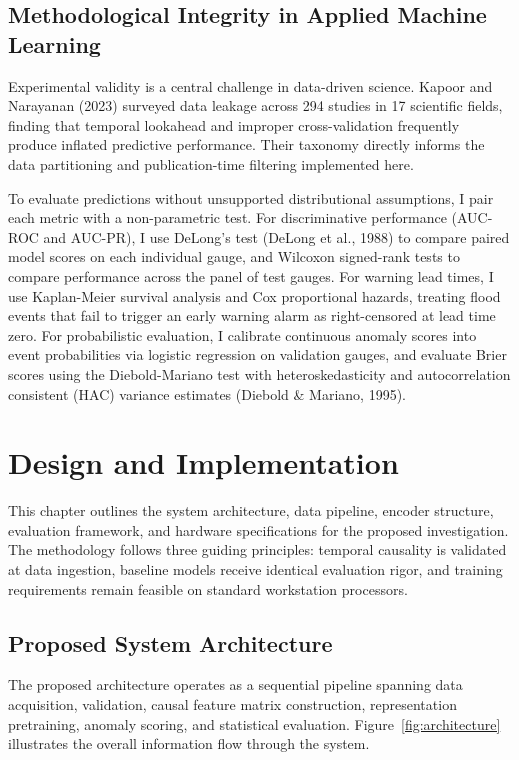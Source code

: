 \documentclass[12pt]{report}
\begin{document}
\section{Methodological Integrity in Applied Machine Learning}

Experimental validity is a central challenge in data-driven science. Kapoor and Narayanan (2023) surveyed data leakage across 294 studies in 17 scientific fields, finding that temporal lookahead and improper cross-validation frequently produce inflated predictive performance. Their taxonomy directly informs the data partitioning and publication-time filtering implemented here.

To evaluate predictions without unsupported distributional assumptions, I pair each metric with a non-parametric test. For discriminative performance (AUC-ROC and AUC-PR), I use DeLong's test (DeLong et al., 1988) to compare paired model scores on each individual gauge, and Wilcoxon signed-rank tests to compare performance across the panel of test gauges. For warning lead times, I use Kaplan-Meier survival analysis and Cox proportional hazards, treating flood events that fail to trigger an early warning alarm as right-censored at lead time zero. For probabilistic evaluation, I calibrate continuous anomaly scores into event probabilities via logistic regression on validation gauges, and evaluate Brier scores using the Diebold-Mariano test with heteroskedasticity and autocorrelation consistent (HAC) variance estimates (Diebold \& Mariano, 1995).


\chapter{Design and Implementation}

This chapter outlines the system architecture, data pipeline, encoder structure, evaluation framework, and hardware specifications for the proposed investigation. The methodology follows three guiding principles: temporal causality is validated at data ingestion, baseline models receive identical evaluation rigor, and training requirements remain feasible on standard workstation processors.

\section{Proposed System Architecture}

The proposed architecture operates as a sequential pipeline spanning data acquisition, validation, causal feature matrix construction, representation pretraining, anomaly scoring, and statistical evaluation. Figure~\ref{fig:architecture} illustrates the overall information flow through the system.
\end{document}
